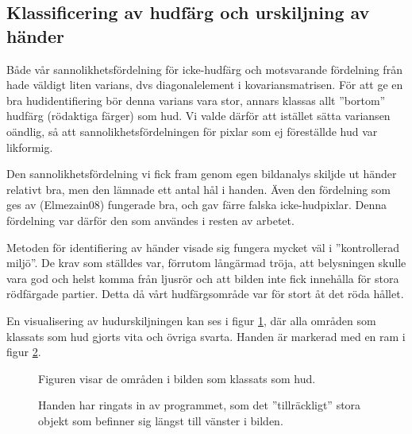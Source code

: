\documentclass[../rapport_MVEX01-11-05]{subfiles}
\begin{document}
\subsection{Klassificering av hudfärg och urskiljning av händer}
Både vår sannolikhetsfördelning för icke-hudfärg och motsvarande
fördelning från  hade väldigt liten varians,
dvs diagonalelement i kovariansmatrisen. För att ge en bra
hudidentifiering bör denna varians vara stor, annars klassas allt
''bortom'' hudfärg (rödaktiga färger) som hud. Vi valde därför att
istället sätta variansen oändlig, så att sannolikhetsfördelningen för
pixlar som ej föreställde hud var likformig.

Den sannolikhetsfördelning vi fick fram genom egen bildanalys skiljde
ut händer relativt bra, men den lämnade ett antal hål i handen. Även
den fördelning som ges av \citeasnoun(Elmezain08) fungerade bra, och
gav färre falska icke-hudpixlar. Denna fördelning var därför den som
användes i resten av arbetet. 

Metoden för identifiering av händer visade sig fungera mycket väl i
''kontrollerad miljö''. De krav som ställdes var, förrutom långärmad
tröja, att belysningen skulle vara god och helst komma från ljusrör
och att bilden inte fick innehålla för stora rödfärgade partier. Detta
då vårt hudfärgsområde var för stort åt det röda hållet. 

En visualisering av hudurskiljningen kan ses i figur
\ref{fig:hudklassificering}, där alla områden som klassats som hud
gjorts vita och övriga svarta. Handen är markerad med en ram i figur
\ref{fig:handklassificering}.

\begin{figure}
	  \centering
		\label{fig:hudklassificering}
		\caption{Figuren visar de områden i bilden som
                  klassats som hud.}
\end{figure}

\begin{figure}
	  \centering
		\label{fig:handklassificering}
		\caption{Handen har ringats in av programmet, som det
                  ''tillräckligt'' stora objekt som befinner sig
                  längst till vänster i bilden.}
\end{figure}
\end{document}
